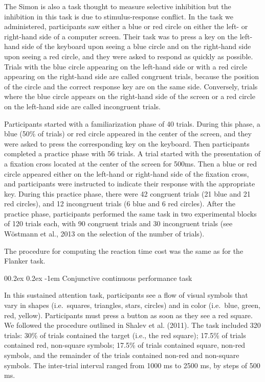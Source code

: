 \documentclass[
  man,floatsintext]{apa6}
\makeatletter
\let\oldparagraph\paragraph
\renewcommand{\paragraph}[1]{\oldparagraph{#1}\mbox{}}
\renewcommand{\paragraph}{\@startsection{paragraph}{4}{\parindent}%
  {0\baselineskip \@plus 0.2ex \@minus 0.2ex}%
  {-1em}%
  {\normalfont\normalsize\bfseries\itshape\typesectitle}}
\makeatother
\begin{document}
The Simon is also a task thought to measure selective inhibition but the inhibition in this task is due to stimulus-response conflict. In the task we administered, participants saw either a blue or red circle on either the left- or right-hand side of a computer screen. Their task was to press a key on the left-hand side of the keyboard upon seeing a blue circle and on the right-hand side upon seeing a red circle, and they were asked to respond as quickly as possible. Trials with the blue circle appearing on the left-hand side or with a red circle appearing on the right-hand side are called congruent trials, because the position of the circle and the correct response key are on the same side. Conversely, trials where the blue circle appears on the right-hand side of the screen or a red circle on the left-hand side are called incongruent trials.

Participants started with a familiarization phase of 40 trials. During this phase, a blue (50\% of trials) or red circle appeared in the center of the screen, and they were asked to press the corresponding key on the keyboard. Then participants completed a practice phase with 56 trials. A trial started with the presentation of a fixation cross located at the center of the screen for 500ms. Then a blue or red circle appeared either on the left-hand or right-hand side of the fixation cross, and participants were instructed to indicate their response with the appropriate key. During this practice phase, there were 42 congruent trials (21 blue and 21 red circles), and 12 incongruent trials (6 blue and 6 red circles). After the practice phase, participants performed the same task in two experimental blocks of 120 trials each, with 90 congruent trials and 30 incongruent trials (see Wöstmann et al., 2013 on the selection of the number of trials).

The procedure for computing the reaction time cost was the same as for the Flanker task.

\hypertarget{conjunctive-continuous-performance-task}{%
\paragraph{Conjunctive continuous performance task}\label{conjunctive-continuous-performance-task}}

In this sustained attention task, participants see a flow of visual symbols that vary in shapes (i.e.~squares, triangles, stars, circles) and in color (i.e.~blue, green, red, yellow). Participants must press a button as soon as they see a red square. We followed the procedure outlined in Shalev et al. (2011). The task included 320 trials: 30\% of trials contained the target (i.e., the red square); 17.5\% of trials contained red, non-square symbols; 17.5\% of trials contained square, non-red symbols, and the remainder of the trials contained non-red and non-square symbols. The inter-trial interval ranged from 1000 ms to 2500 ms, by steps of 500 ms.
\end{document}
